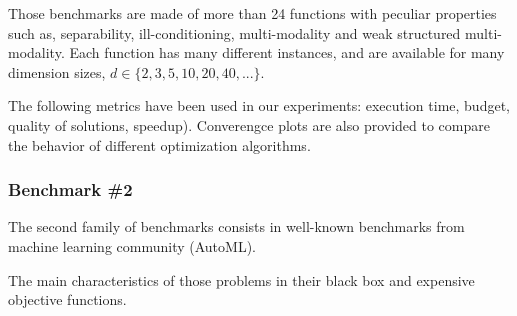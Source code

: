 \begin{itemize}
\begin{itemize}
Those benchmarks are made of more than 24 functions with peculiar properties such as, separability, ill-conditioning, multi-modality and weak structured multi-modality. Each function has many different instances, and are available for many dimension sizes, $d \in  \{ 2,3,5,10,20,40, ... \}$. 
\end{itemize}

The following metrics have been used in our experiments: execution time, budget, quality of solutions, speedup). Converengce plots are also provided to compare the behavior of different optimization algorithms.









\subsubsection{Benchmark \#2}

The second family of benchmarks consists in well-known benchmarks from machine learning community (AutoML). 

The main characteristics of those problems in their black box and expensive objective functions.


\end{itemize}
